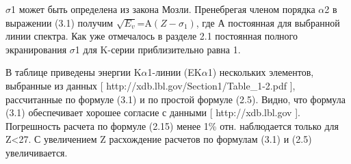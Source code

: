 \documentclass[a4paper,14pt, openany, twoside, draft]{extbook} %
\begin{document}
${\sigma}$1 может быть определена из закона Мозли. Пренебрегая членом порядка ${\alpha}$2 в выражении (3.1) получим  $\sqrt{E_v}{\text{=A}}(Z-\sigma _1)$, где А постоянная для выбранной линии спектра. Как уже отмечалось в разделе 2.1 постоянная полного экранирования ${\sigma}$1  для K{}-серии приблизительно равна 1.

В таблице приведены энергии K${\alpha}$1{}-линии (EK${\alpha}$1) нескольких элементов, выбранные из данных [ http://xdb.lbl.gov/Section1/Table\_1-2.pdf ], рассчитанные по формуле (3.1) и по простой формуле (2.5). Видно, что формула (3.1) обеспечивает хорошее согласие с данными  [ http://xdb.lbl.gov ]. Погрешность расчета по формуле (2.15) менее 1\% отн. наблюдается только для Z{\textless}27. С увеличением Z расхождение расчетов по формулам (3.1) и (2.5) увеличивается.
\end{document}
